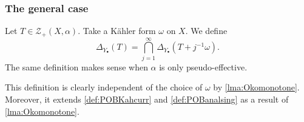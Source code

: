 \subsubsection{The general case}
\label{subsubsec:tpob_general}

\begin{definition}\label{def:generalPOB}
    Let $T\in \mathcal{Z}_+(X,\alpha)$. Take a Kähler form $\omega$ on $X$. We define
    \begin{equation}\label{eq:DeltaTgeneral}
        \Delta_{Y_{\bullet}}(T)=\bigcap_{j=1}^{\infty}\Delta_{Y_{\bullet}}(T+j^{-1}\omega).
    \end{equation}
    The same definition makes sense when $\alpha$ is only pseudo-effective.
\end{definition}
This definition is clearly independent of the choice of $\omega$ by \cref{lma:Okomonotone}. Moreover, it extends \cref{def:POBKahcurr} and \cref{def:POBanalsing} as a result of \cref{lma:Okomonotone}.

